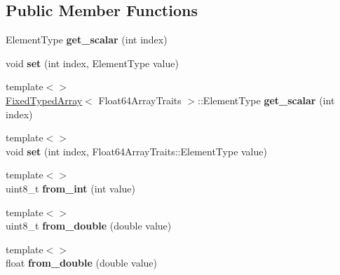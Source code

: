 \subsection*{Public Member Functions}
\begin{DoxyCompactItemize}
\item 
\hypertarget{classv8_1_1internal_1_1_fixed_typed_array_a9b645785a671dab9ef26f1b7332ce643}{}Element\+Type {\bfseries get\+\_\+scalar} (int index)\label{classv8_1_1internal_1_1_fixed_typed_array_a9b645785a671dab9ef26f1b7332ce643}

\item 
\hypertarget{classv8_1_1internal_1_1_fixed_typed_array_a42f81163d59b755e257227b3f8bcf22e}{}void {\bfseries set} (int index, Element\+Type value)\label{classv8_1_1internal_1_1_fixed_typed_array_a42f81163d59b755e257227b3f8bcf22e}

\item 
\hypertarget{classv8_1_1internal_1_1_fixed_typed_array_abade4dbbf5f7cccaba9a5342dafabe11}{}{\footnotesize template$<$$>$ }\\\hyperlink{classv8_1_1internal_1_1_fixed_typed_array}{Fixed\+Typed\+Array}$<$ Float64\+Array\+Traits $>$\+::Element\+Type {\bfseries get\+\_\+scalar} (int index)\label{classv8_1_1internal_1_1_fixed_typed_array_abade4dbbf5f7cccaba9a5342dafabe11}

\item 
\hypertarget{classv8_1_1internal_1_1_fixed_typed_array_a887881588fdbf76f497af1cbd604d3f0}{}{\footnotesize template$<$$>$ }\\void {\bfseries set} (int index, Float64\+Array\+Traits\+::\+Element\+Type value)\label{classv8_1_1internal_1_1_fixed_typed_array_a887881588fdbf76f497af1cbd604d3f0}

\item 
\hypertarget{classv8_1_1internal_1_1_fixed_typed_array_a4a1669ff59ffbffee79c146093105157}{}{\footnotesize template$<$$>$ }\\uint8\+\_\+t {\bfseries from\+\_\+int} (int value)\label{classv8_1_1internal_1_1_fixed_typed_array_a4a1669ff59ffbffee79c146093105157}

\item 
\hypertarget{classv8_1_1internal_1_1_fixed_typed_array_a35a7dfad90f049ea4801bd747a528d7c}{}{\footnotesize template$<$$>$ }\\uint8\+\_\+t {\bfseries from\+\_\+double} (double value)\label{classv8_1_1internal_1_1_fixed_typed_array_a35a7dfad90f049ea4801bd747a528d7c}

\item 
\hypertarget{classv8_1_1internal_1_1_fixed_typed_array_a2cc4907615b08f33d6db162e07a33805}{}{\footnotesize template$<$$>$ }\\float {\bfseries from\+\_\+double} (double value)\label{classv8_1_1internal_1_1_fixed_typed_array_a2cc4907615b08f33d6db162e07a33805}


\end{DoxyCompactItemize}
